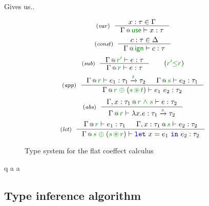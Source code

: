 Gives us..

\begin{figure}[t]
\begin{equation*}
\tyrule{var}
  {x : \tau \in \Gamma}
  {\coctx{\Gamma}{\cunit} \vdash x : \tau }
\end{equation*}
\begin{equation*}
\tyrule{const}
  {c : \tau \in \Delta}
  {\coctx{\Gamma}{\czero} \vdash c : \tau }
\end{equation*}
\begin{equation*}
\tyrule{sub}
  {\coctx{\Gamma}{\cclrd{r'}} \vdash e : \tau }
  {\coctx{\Gamma}{\cclrd{r}} \vdash e : \tau }\quad\quad(\cclrd{r'} \cleq \cclrd{r})
\end{equation*}
\begin{equation*}
\tyrule{app}
  {\coctx{\Gamma}{\cclrd{r}} \vdash e_1 : \tau_1 \xrightarrow{\cclrd{t}} \tau_2 &
   \coctx{\Gamma}{\cclrd{s}} \vdash e_2 : \tau_1 }
  {\coctx{\Gamma}{\cclrd{r} \;\cpar\; (\cclrd{s} \,\cseq\, \cclrd{t})} \vdash e_1~e_2 : \tau_2}
\end{equation*}
\begin{equation*}
\tyrule{abs}
  {\coctx{\Gamma, x:\tau_1}{\cclrd{r}\;\czip\;\cclrd{s}} \vdash e : \tau_2}
  {\coctx{\Gamma}{\cclrd{r}} \vdash \lambda x.e : \tau_1 \xrightarrow{\cclrd{s}} \tau_2 }
\end{equation*}
\begin{equation*}
\tyrule{let}
  { \coctx{\Gamma}{\cclrd{r}} \vdash e_1 : \tau_1 &
    \coctx{\Gamma, x:\tau_1}{\cclrd{s}} \vdash e_2 : \tau_2}
  {\coctx{\Gamma}{\cclrd{s} \;\cpar\; (\cclrd{s} \,\cseq\, \cclrd{r})} \vdash \kvd{let}~x=e_1~\kvd{in}~e_2 : \tau_2 }
\end{equation*}

\caption{Type system for the flat coeffect calculus}
\label{fig:flat-types2}
\end{figure}

q
\newpage
a
\newpage
a
\newpage


\subsection{Type inference algorithm}



%                                                                   
%                                                                

